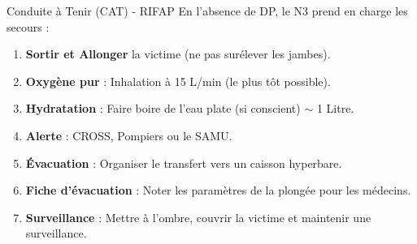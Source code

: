 \begin{frame}{Conduite à Tenir (CAT) - RIFAP}
    En l'absence de DP, le N3 prend en charge les secours :
    
    \begin{enumerate}
        \item \textbf{Sortir et Allonger} la victime (ne pas surélever les jambes).
        \item \textbf{Oxygène pur} : Inhalation à 15 L/min (le plus tôt possible).
        \item \textbf{Hydratation} : Faire boire de l'eau plate (si conscient) $\sim$ 1 Litre.
        \item \textbf{Alerte} : CROSS, Pompiers ou le SAMU.
        \item \textbf{Évacuation} : Organiser le transfert vers un caisson hyperbare.
        \item \textbf{Fiche d'évacuation} : Noter les paramètres de la plongée pour les médecins.
        \item \textbf{Surveillance} : Mettre à l'ombre, couvrir la victime et maintenir une surveillance.
    \end{enumerate}
\end{frame}
